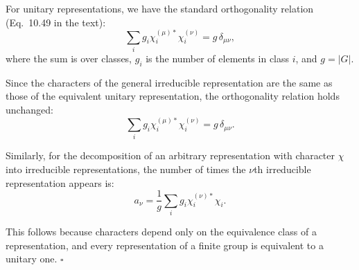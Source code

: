 \documentclass[12pt]{article}
\begin{document}
For unitary representations, we have the standard orthogonality relation (Eq.~10.49 in the text):
\[
\sum_{i} g_i \chi_i^{(\mu)*} \chi_i^{(\nu)} = g\,\delta_{\mu\nu},
\]
where the sum is over classes, $g_i$ is the number of elements in class $i$, and $g = |G|$.

Since the characters of the general irreducible representation are the same as those of the equivalent unitary representation, the orthogonality relation holds unchanged:
\[
\boxed{\sum_{i} g_i \chi_i^{(\mu)*} \chi_i^{(\nu)} = g\,\delta_{\mu\nu}.}
\]

Similarly, for the decomposition of an arbitrary representation with character $\chi$ into irreducible representations, the number of times the $\nu$th irreducible representation appears is:
\[
\boxed{a_\nu = \frac{1}{g}\sum_{i} g_i \chi_i^{(\nu)*} \chi_i.}
\]

This follows because characters depend only on the equivalence class of a representation, and every representation of a finite group is equivalent to a unitary one. $\square$
\end{document}
